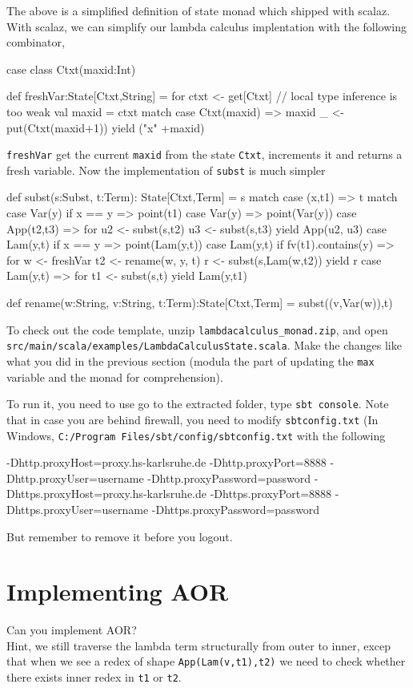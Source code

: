 \documentclass[10pt]{article}
\begin{document}
The above is a simplified definition of state monad which shipped with scalaz. With scalaz, we can simplify 
our lambda calculus implentation with the following combinator, 
\begin{code}
  case class Ctxt(maxid:Int)

  def freshVar:State[Ctxt,String] = for {
    ctxt <- get[Ctxt] // local type inference is too weak
    val maxid = ctxt match { case Ctxt(maxid) => maxid }
    _ <- put(Ctxt(maxid+1))
  } yield ("x" +maxid)
\end{code}
%
{\tt freshVar} get the current {\tt maxid} from the state {\tt Ctxt}, increments it and returns a fresh variable. Now the implementation of {\tt subst}
is much simpler
\begin{code}
  def subst(s:Subst, t:Term): State[Ctxt,Term] = s match {
    case (x,t1) => t match {
      case Var(y) if x == y => point(t1)
      case Var(y)           => point(Var(y))
      case App(t2,t3)       => for {
        u2 <- subst(s,t2)
        u3 <- subst(s,t3)
      } yield App(u2, u3)
      case Lam(y,t) if x == y => {
        point(Lam(y,t))
      }
      case Lam(y,t) if fv(t1).contains(y) => for {
        w  <- freshVar
        t2 <- rename(w, y, t)
        r  <- subst(s,Lam(w,t2))
      } yield r
      case Lam(y,t) => for {
        t1 <- subst(s,t)
      } yield Lam(y,t1)
    }
  }

  def rename(w:String, v:String, t:Term):State[Ctxt,Term] =
    subst((v,Var(w)),t)
\end{code}

To check out the code template, unzip {\tt lambdacalculus\_monad.zip}, and open {\tt src/main/scala/examples/LambdaCalculusState.scala}.
Make the changes like what you did in the previous section (modula the part of updating the {\tt max} variable and the monad for comprehension).

To run it, you need to use go to the extracted folder, type {\tt sbt console}. 
Note that in case you are behind firewall, you need to modify {\tt sbtconfig.txt} (In Windows, {\tt C:/Program Files/sbt/config/sbtconfig.txt} with the following
\begin{code}
-Dhttp.proxyHost=proxy.hs-karlsruhe.de
-Dhttp.proxyPort=8888
-Dhttp.proxyUser=username
-Dhttp.proxyPassword=password
-Dhttps.proxyHost=proxy.hs-karlsruhe.de
-Dhttps.proxyPort=8888
-Dhttps.proxyUser=username
-Dhttps.proxyPassword=password
\end{code}
But remember to remove it before you logout.

\section{Implementing AOR}
Can you implement AOR? \\ 
 Hint, we still traverse the lambda term structurally from outer to inner, excep that  when we see a redex of shape {\tt App(Lam(v,t1),t2)} we need to check whether 
there exists inner redex in {\tt t1} or {\tt t2}.
\end{document}

